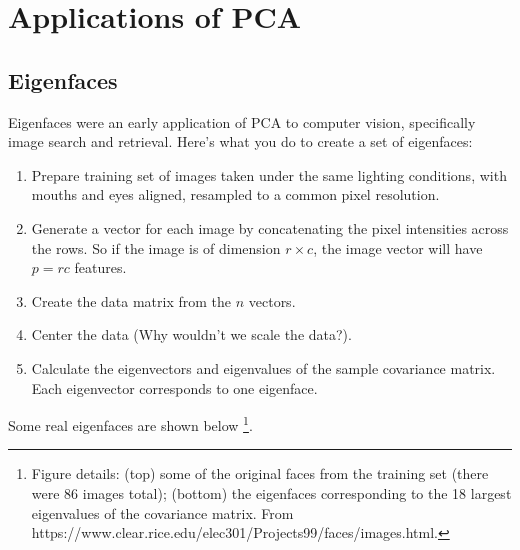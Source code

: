 
\section{Applications of PCA}

\subsection{Eigenfaces}

Eigenfaces were an early application of PCA to computer vision, specifically image search and retrieval. Here's what you do to create a set of eigenfaces:
\begin{enumerate}
\item Prepare training set of images taken under the same lighting conditions, with mouths and eyes aligned, resampled to a common pixel resolution.
\item Generate a vector for each image by concatenating the pixel intensities across the rows. So if the image is of dimension $r \times c$, the image vector will have $p = rc$ features.
\item Create the data matrix from the $n$ vectors.
\item Center the data (Why wouldn't we scale the data?).
\item Calculate the eigenvectors and eigenvalues of the sample covariance matrix. Each eigenvector corresponds to one eigenface. 
\end{enumerate}

Some real eigenfaces are shown below \footnote{Figure details: (top) some of the original faces from the training set (there were 86 images total); (bottom) the eigenfaces corresponding to the 18 largest eigenvalues of the covariance matrix. From https://www.clear.rice.edu/elec301/Projects99/faces/images.html.}. 

